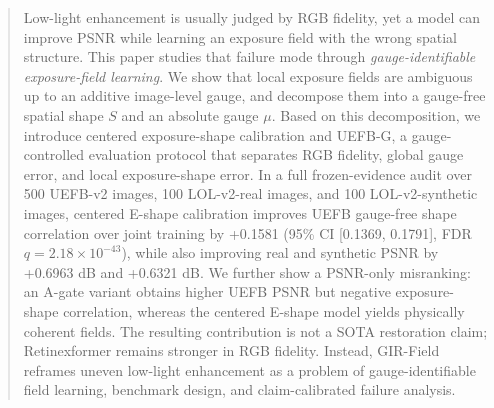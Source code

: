 \begin{abstract}
Low-light enhancement is usually judged by RGB fidelity, yet a model can improve PSNR while learning an exposure field with the wrong spatial structure. This paper studies that failure mode through \emph{gauge-identifiable exposure-field learning}. We show that local exposure fields are ambiguous up to an additive image-level gauge, and decompose them into a gauge-free spatial shape $S$ and an absolute gauge $\mu$. Based on this decomposition, we introduce centered exposure-shape calibration and UEFB-G, a gauge-controlled evaluation protocol that separates RGB fidelity, global gauge error, and local exposure-shape error. In a full frozen-evidence audit over 500 UEFB-v2 images, 100 LOL-v2-real images, and 100 LOL-v2-synthetic images, centered E-shape calibration improves UEFB gauge-free shape correlation over joint training by +0.1581 (95\% CI [0.1369, 0.1791], FDR $q=2.18\times10^{-43}$), while also improving real and synthetic PSNR by +0.6963 dB and +0.6321 dB. We further show a PSNR-only misranking: an A-gate variant obtains higher UEFB PSNR but negative exposure-shape correlation, whereas the centered E-shape model yields physically coherent fields. The resulting contribution is not a SOTA restoration claim; Retinexformer remains stronger in RGB fidelity. Instead, GIR-Field reframes uneven low-light enhancement as a problem of gauge-identifiable field learning, benchmark design, and claim-calibrated failure analysis.
\end{abstract}
